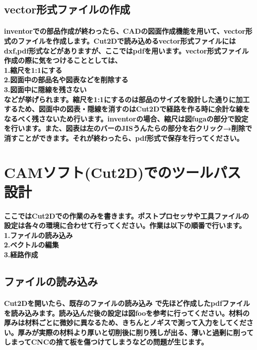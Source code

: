 \documentclass[b5paper, 9pt, twocolumn, titlepage,openany]{jsbook}%
\begin{document}
\subsection{vector形式ファイルの作成}
\paragraph{inventorでの部品作成が終わったら、CADの図面作成機能を用いて、vector形式のファイルを作成します。Cut2Dで読み込めるvector形式ファイルにはdxf,pdf形式などがありますが、ここではpdfを用います。vector形式ファイル作成の際に気をつけることとしては、\\
1.縮尺を1:1にする\\
2.図面中の部品名や図表などを削除する\\
3.図面中に隠線を残さない\\
などが挙げられます。縮尺を1:1にするのは部品のサイズを設計した通りに加工するため、図面中の図表・隠線を消すのはCut2Dで経路を作る時に余計な線をなるべく残さないため行います。inventorの場合、縮尺は図fugaの部分で設定を行います。また、図表は左のバーのJISうんたらの部分を右クリック→削除で消すことができます。それが終わったら、pdf形式で保存を行ってください。}

\section{CAMソフト(Cut2D)でのツールパス設計}
\paragraph{ここではCut2Dでの作業のみを書きます。ポストプロセッサや工具ファイルの設定は各々の環境に合わせて行ってください。作業は以下の順番で行います。
1.ファイルの読み込み\\
2.ベクトルの編集\\
3.経路作成}

\subsection{ファイルの読み込み}
\paragraph{Cut2Dを開いたら、既存のファイルの読み込み で先ほど作成したpdfファイルを読み込みます。読み込んだ後の設定は図fooを参考に行ってください。材料の厚みは材料ごとに微妙に異なるため、きちんとノギスで測って入力をしてください。厚みが実際の材料より厚いと切削後に削り残しが出る、薄いと過剰に削ってしまってCNCの捨て板を傷つけてしまうなどの問題が生じます。}
\end{document}
